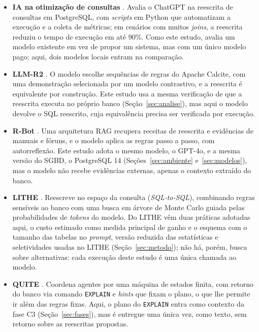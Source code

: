 \documentclass[12pt]{article}
\begin{document}
\begin{itemize}
\item \textbf{IA na otimização de consultas} \cite{amaral2025}. Avalia o ChatGPT na reescrita de consultas em PostgreSQL, com \textit{scripts} em Python que automatizam a execução e a coleta de métricas; em cenários com muitos \textit{joins}, a reescrita reduziu o tempo de execução em até 90\%. Como este estudo, avalia um modelo existente em vez de propor um sistema, mas com um único modelo pago; aqui, dois modelos locais entram na comparação.

\item \textbf{LLM-R2} \cite{li2024llmr2}. O modelo escolhe sequências de regras do Apache Calcite, com uma demonstração selecionada por um modelo contrastivo, e a reescrita é equivalente por construção. Este estudo usa a mesma verificação de que a reescrita executa no próprio banco (Seção~\ref{sec:analise}), mas aqui o modelo devolve o SQL reescrito, cuja equivalência precisa ser verificada por execução.

\item \textbf{R-Bot} \cite{sun2025rbot}. Uma arquitetura RAG recupera receitas de reescrita e evidências de manuais e fóruns, e o modelo aplica as regras passo a passo, com autorreflexão. Este estudo adota o mesmo modelo, o GPT-4o, e a mesma versão do SGBD, o PostgreSQL 14 (Seções~\ref{sec:ambiente} e~\ref{sec:modelos}), mas o modelo não recebe evidências externas, apenas o contexto extraído do banco.

\item \textbf{LITHE} \cite{dharwada2026lithe}. Reescreve no espaço da consulta (\textit{SQL-to-SQL}), combinando regras sensíveis ao banco com uma busca em árvore de Monte Carlo guiada pelas probabilidades de \textit{tokens} do modelo. Do LITHE vêm duas práticas adotadas aqui, o custo estimado como medida principal de ganho e o esquema com o tamanho das tabelas no \textit{prompt}, versão reduzida das estatísticas e seletividades usadas no LITHE (Seção~\ref{sec:metodo}); não há, porém, busca sobre alternativas: cada execução deste estudo é uma única chamada ao modelo.

\item \textbf{QUITE} \cite{song2025quite}. Coordena agentes por uma máquina de estados finita, com retorno do banco via comando \texttt{EXPLAIN} e \textit{hints} que fixam o plano, o que lhe permite ir além das regras fixas. Aqui, o plano do \texttt{EXPLAIN} entra como contexto da fase C3 (Seção~\ref{sec:fases}), mas é entregue uma única vez, como texto, sem retorno sobre as reescritas propostas.


\end{itemize}
\end{document}
